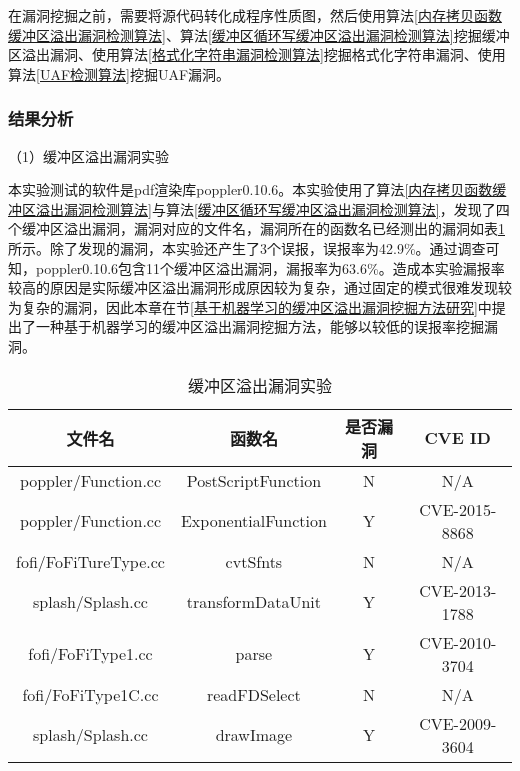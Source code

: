 {在漏洞挖掘之前，需要将源代码转化成程序性质图，然后使用算法\ref{内存拷贝函数缓冲区溢出漏洞检测算法}、算法\ref{缓冲区循环写缓冲区溢出漏洞检测算法}挖掘缓冲区溢出漏洞、使用算法\ref{格式化字符串漏洞检测算法}挖掘格式化字符串漏洞、使用算法\ref{UAF检测算法}挖掘UAF漏洞。

\subsubsection{结果分析}

（1）缓冲区溢出漏洞实验

本实验测试的软件是pdf渲染库poppler0.10.6。本实验使用了算法\ref{内存拷贝函数缓冲区溢出漏洞检测算法}与算法\ref{缓冲区循环写缓冲区溢出漏洞检测算法}，发现了四个缓冲区溢出漏洞，漏洞对应的文件名，漏洞所在的函数名已经测出的漏洞如表\ref{缓冲区溢出漏洞实验}所示。除了发现的漏洞，本实验还产生了3个误报，误报率为42.9\%。通过调查可知，poppler0.10.6包含11个缓冲区溢出漏洞，漏报率为63.6\%。造成本实验漏报率较高的原因是实际缓冲区溢出漏洞形成原因较为复杂，通过固定的模式很难发现较为复杂的漏洞，因此本章在节\ref{基于机器学习的缓冲区溢出漏洞挖掘方法研究}中提出了一种基于机器学习的缓冲区溢出漏洞挖掘方法，能够以较低的误报率挖掘漏洞。

\begin{table}[ht]
\begin{center}
\caption{缓冲区溢出漏洞实验} \label{缓冲区溢出漏洞实验}
\begin{small}
\begin{tabular}{cccc}
\hline 
文件名 & 函数名 & 是否漏洞 & CVE ID\tabularnewline
\hline 
poppler/Function.cc & PostScriptFunction & N & N/A\tabularnewline
poppler/Function.cc & ExponentialFunction & Y & CVE-2015-8868\tabularnewline


fofi/FoFiTureType.cc & cvtSfnts & N & N/A\tabularnewline

splash/Splash.cc & transformDataUnit & Y & CVE-2013-1788\tabularnewline

 
fofi/FoFiType1.cc & parse & Y & CVE-2010-3704\tabularnewline

fofi/FoFiType1C.cc & readFDSelect & N & N/A\tabularnewline

splash/Splash.cc & drawImage & Y & CVE-2009-3604\tabularnewline

\hline 
\end{tabular}
\end{small}
\end{center}
\end{table}

}
